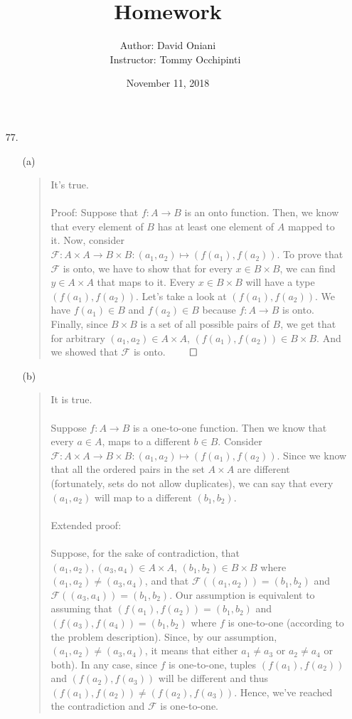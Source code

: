 \documentclass[12pt, a4paper]{article}
\title{\bf{Homework \textnumero 11}}
\author{Author: David Oniani
\\
\ \ \ Instructor: Tommy Occhipinti}
\date{November 11, 2018}
\begin{document}
\maketitle

\begin{itemize}
\item[77.]
\begin{itemize}
\item[(a)]
\begin{quote}
It's true.\\\\
Proof: Suppose that $f : A \rightarrow B$ is an onto function.
Then, we know that every element of $B$ has at least one element
of $A$ mapped to it. Now, consider $\mathcal{F} : A \times A \rightarrow B \times B : (a_1, a_2) \mapsto (f(a_1), f(a_2))$.
To prove that $\mathcal{F}$ is onto, we have to show that for every $x \in B \times B$, we can find $y \in A \times A$ that maps
to it. Every $x \in B \times B$ will have a type $(f(a_1), f(a_2))$. Let's take a look at $(f(a_1), f(a_2))$.
We have $f(a_1) \in B$ and $f(a_2) \in B$ because $f : A \rightarrow B$ is onto. Finally, since $B \times B$
is a set of all possible pairs of $B$, we get that for arbitrary $(a_1, a_2) \in A \times A$, $(f(a_1), f(a_2)) \in B \times B$.
And we showed that $\mathcal{F}$ is onto.
$\qed$
\end{quote}

\item[]

\item[(b)]
\begin{quote}
It is true.\\\\
Suppose $f : A \rightarrow B$ is a one-to-one function. Then we know that every $a \in A$,
maps to a different $b \in B$. Consider $\mathcal{F} : A \times A \rightarrow B \times B : (a_1, a_2) \mapsto (f(a_1), f(a_2))$.
Since we know that all the ordered pairs in the set $A \times A$ are different (fortunately, sets do not allow duplicates),
we can say that every $(a_1, a_2)$ will map to a different $(b_1, b_2)$.\\\\
Extended proof:\\\\
Suppose, for the sake of contradiction, that $(a_1, a_2), (a_3, a_4) \in A \times A$, $(b_1, b_2) \in B \times B$ where $(a_1, a_2) \neq (a_3, a_4)$, and
that $\mathcal{F}((a_1, a_2)) =(b_1, b_2)$ and $\mathcal{F}((a_3, a_4)) =(b_1, b_2)$. Our assumption is equivalent to assuming
that $(f(a_1), f(a_2)) =(b_1, b_2)$ and $(f(a_3), f(a_4)) = (b_1, b_2)$ where $f$ is one-to-one (according to the problem description).
Since, by our assumption, $(a_1, a_2) \neq (a_3, a_4)$, it means that either $a_1 \neq a_3$ or $a_2 \neq a_4$ or both). In any case, since $f$ is one-to-one,
tuples $(f(a_1), f(a_2))$ and $(f(a_2), f(a_3))$ will be different and thus $(f(a_1), f(a_2)) \neq (f(a_2), f(a_3))$.
Hence, we've reached the contradiction and $\mathcal{F}$ is one-to-one.
\end{quote}


\end{itemize}
\end{itemize}
\end{document}
